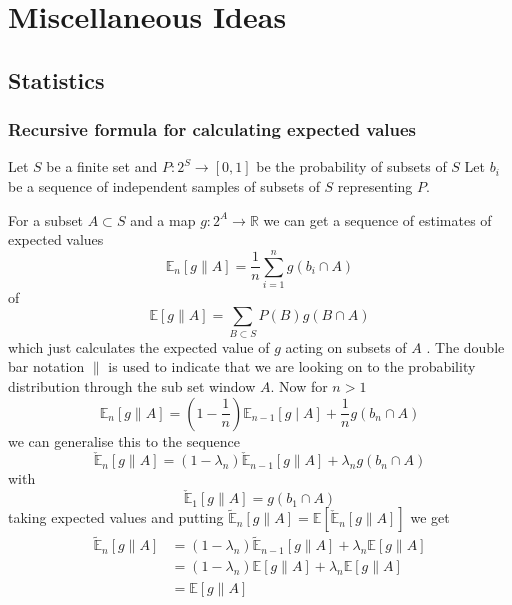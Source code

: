 \documentclass[a4paper,oneside,english]{book}
\numberwithin{equation}{section}
\numberwithin{figure}{section}
\begin{document}
\part{Miscellaneous Ideas}
\chapter{Statistics}


\section{Recursive formula for calculating expected values}


Let $S$ be a finite set and $P:2^S \longrightarrow [0,1]$ be the probability of subsets of $S$
Let $b_{i}$ be a sequence of independent samples of subsets of $S$ 
representing $P$. 

For a subset $A\subset S$ and a map $g:2^{A}\rightarrow\mathbb{R}$
we can get a sequence of estimates of expected values
\[
\mathbb{E}_{n}[g\parallel A]=\frac{1}{n}\sum_{i=1}^{n}g(b_{i}\cap A)
\]
of 
\[
\mathbb{E}[g\parallel A]=\sum_{B\subset S}P(B)g(B\cap A)
\]
which just calculates the expected value of $g$ acting on subsets
of $A$ . The double bar notation $\parallel$ is used to indicate
that we are looking on to the probability distribution through the
sub set window $A$. Now for $n>1$ 
\[
\mathbb{E}_{n}[g\parallel A]=\left(1-\frac{1}{n}\right)\mathbb{E}_{n-1}[g\mid A]+\frac{1}{n}g(b_{n}\cap A)
\]
we can generalise this to the sequence 
\[
\check{\mathbb{E}}_{n}[g\parallel A]=\left(1-\lambda_{n}\right)\mathbb{\check{E}}_{n-1}[g\parallel A]+\lambda_{n}g(b_{n}\cap A)
\]
with 
\[
\check{\mathbb{E}}_{1}[g\parallel A]=g(b_{1}\cap A)
\]
taking expected values and putting $\mathbb{\tilde{E}}_{n}[g\parallel A]=\mathbb{E}\left[\check{\mathbb{E}}_{n}[g\parallel A]\right]$
we get
\begin{align}
\mathbb{\tilde{E}}_{n}[g\parallel A] & = (1-\lambda_{n})\mathbb{\tilde{E}}_{n-1}[g\parallel A]+\lambda_{n}\mathbb{E}[g\parallel A]\\
& = (1-\lambda_{n})\mathbb{\mathbb{E}}[g\parallel A]+\lambda_{n}\mathbb{E}[g\parallel A]\\
& = \mathbb{E}[g\parallel A]
\end{align}
\end{document}
